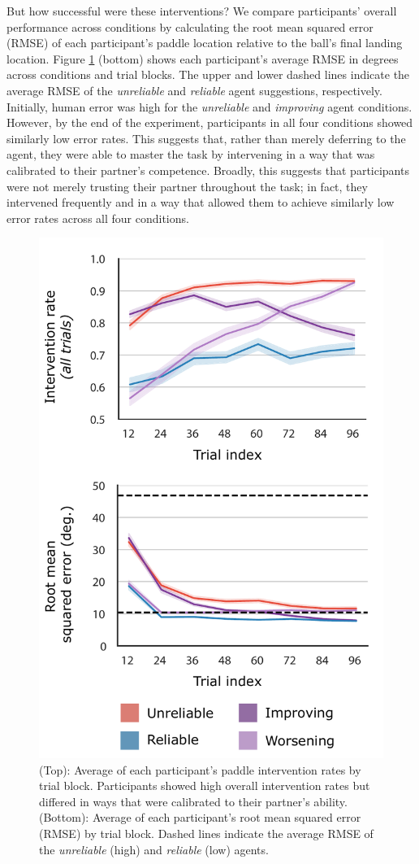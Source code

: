 \documentclass[10pt,letterpaper]{article}
\begin{document}
But how successful were these interventions? We compare participants' overall performance across conditions by calculating the root mean squared error (RMSE) of each participant's paddle location relative to the ball's final landing location. Figure \ref{fig:rmse} (bottom) shows each participant's average RMSE in degrees across conditions and trial blocks. The upper and lower dashed lines indicate the average RMSE of the \textit{unreliable} and \textit{reliable} agent suggestions, respectively. Initially, human error was high for the \textit{unreliable} and \textit{improving} agent conditions. However, by the end of the experiment, participants in all four conditions showed similarly low error rates. This suggests that, rather than merely deferring to the agent, they were able to master the task by intervening in a way that was calibrated to their partner's competence.  Broadly, this suggests that participants were not merely trusting their partner throughout the task; in fact, they intervened frequently and in a way that allowed them to achieve similarly low error rates across all four conditions. 


\begin{figure}[H]
\begin{center}
\includegraphics[width=.75\linewidth]{img/rmse_intervention_rate.pdf}
\end{center}
\caption{(Top): Average of each participant's paddle intervention rates by trial block. Participants showed high overall intervention rates but differed in ways that were calibrated to their partner's ability. (Bottom): Average of each participant's root mean squared error (RMSE) by trial block. Dashed lines indicate the average RMSE of the \textit{unreliable} (high) and \textit{reliable} (low) agents.}
\label{fig:rmse}
\end{figure}
\end{document}

